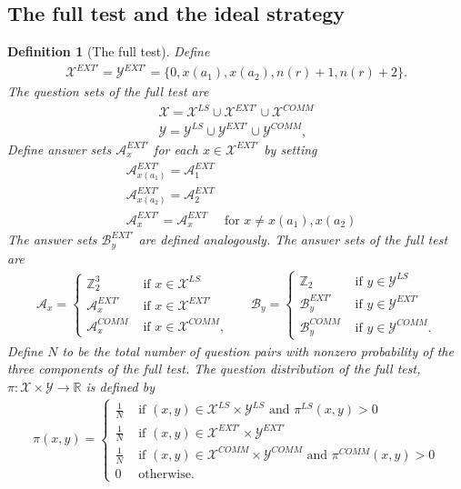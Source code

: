 \documentclass[11pt,letterpaper]{article}
\newcommand{\R}{\mathbb{R}}
\newcommand{\Z}{\mathbb{Z}}
\newcommand{\calX}{\mathcal{X}}
\newcommand{\calY}{\mathcal{Y}}
\newcommand{\calA}{\mathcal{A}}
\newcommand{\calB}{\mathcal{B}}
\newcommand{\1}{\mathbb{1}}
\newcommand{\EXT}{EXT}
\newcommand{\LS}{LS}
\newcommand{\COMM}{COMM}
\newcommand{\nr}{n(r)}
\newtheorem{definition}[theorem]{Definition}
\theoremstyle{definition}
\begin{document}
\subsection{The full test and the ideal strategy}
\label{sec:ideal_strat}
\begin{definition}[The full test]
\label{def:full_test}
Define 
\begin{align*}
    \calX^{\EXT'} = \calY^{\EXT'} = \{0, x(a_1), x(a_2), \nr+1, \nr+2\}.
\end{align*}
The question sets of the full test are
\begin{align*}
    \calX = \calX^{\LS} \cup \calX^{\EXT'} \cup \calX^{\COMM} \\
    \calY = \calY^{\LS} \cup \calY^{\EXT'} \cup \calY^{\COMM},
\end{align*}
Define answer sets $\calA_x^{\EXT'}$ for each $x \in \calX^{\EXT'}$
by setting 
\begin{align*}
    &\calA_{x(a_1)}^{\EXT'} =\calA_{1}^{\EXT} \\
    &\calA_{x(a_2)}^{\EXT'} =\calA_{2}^{\EXT} \\
    &\calA_{x}^{\EXT'} = \calA_{x}^{\EXT} 
    \quad \text{ for } x \neq x(a_1), x(a_2)
\end{align*}
The answer sets $\calB_y^{\EXT'}$ are defined analogously.
The answer sets of the full test are
\begin{align*}
    \calA_x = 
    \begin{cases}
    \Z_2^3 &\text{ if } x \in \calX^{\LS} \\
    \calA_x^{\EXT'} &\text{ if } x \in \calX^{\EXT'} \\
    \calA_x^{\COMM} & \text{ if } x \in \calX^{\COMM},
    \end{cases}
    &&
    \calB_y = 
    \begin{cases}
    \Z_2 &\text{ if } y \in \calY^{\LS} \\
    \calB_y^{\EXT'} &\text{ if } y \in \calY^{\EXT'} \\
    \calB_y^{\COMM} & \text{ if } y \in \calY^{\COMM}.
    \end{cases}
\end{align*}
Define $N$ to be the total number of question pairs with nonzero probability 
of the three components of the full test.
The question distribution of the full test, $\pi: \calX \times \calY \rightarrow \R$ is defined by
\begin{align*}
    \pi(x,y) = \begin{cases}
    \frac{1}{N} & \text{ if } (x,y) \in \calX^{\LS} \times \calY^{\LS}
    \text{ and } \pi^{\LS}(x,y) > 0 \\
    \frac{1}{N} & \text{ if } (x,y) \in \calX^{\EXT'} \times \calY^{\EXT'}\\
    \frac{1}{N} & \text{ if } (x,y) \in \calX^{\COMM} \times \calY^{\COMM} \text{ and } \pi^{\COMM}(x,y) > 0 \\
    0 & \text{ otherwise}.
    \end{cases}
\end{align*}
\end{definition}
\end{document}
